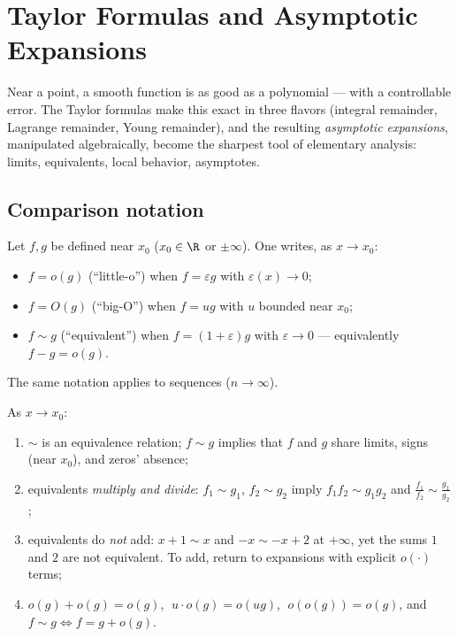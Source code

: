 \chapter{Taylor Formulas and Asymptotic Expansions}\label{ch:b1:taylor}

Near a point, a smooth function is as good as a polynomial --- with a
controllable error. The Taylor formulas make this exact in three
flavors (integral remainder, Lagrange remainder, Young remainder),
and the resulting \emph{asymptotic expansions}, manipulated
algebraically, become the sharpest tool of elementary analysis:
limits, equivalents, local behavior, asymptotes.

\section{Comparison notation}

\begin{definition}\label{def:b1:taylor:landau}
Let $f, g$ be defined near $x_0$ ($x_0 \in \R$ or $\pm\infty$). One
writes, as $x \to x_0$:
\begin{itemize}
  \item $f = o(g)$ (``little-o'') when $f = \varepsilon g$ with
        $\varepsilon(x) \to 0$;
  \item $f = O(g)$ (``big-O'') when $f = u g$ with $u$ bounded near
        $x_0$;
  \item $f \sim g$ (``equivalent'') when
        $f = (1 + \varepsilon) g$ with $\varepsilon \to 0$ ---
        equivalently $f - g = o(g)$.
\end{itemize}
The same notation applies to sequences ($n \to \infty$).
\end{definition}

\begin{proposition}[Rules]\label{prop:b1:taylor:landaurules}
As $x \to x_0$:
\begin{enumerate}
  \item $\sim$ is an equivalence relation; $f \sim g$ implies that
        $f$ and $g$ share limits, signs (near $x_0$), and zeros'
        absence;
  \item equivalents \emph{multiply and divide}: $f_1 \sim g_1$, $f_2
        \sim g_2$ imply $f_1 f_2 \sim g_1 g_2$ and $\frac{f_1}{f_2}
        \sim \frac{g_1}{g_2}$;
  \item equivalents do \emph{not} add: $x + 1 \sim x$ and $-x \sim
        -x + 2$ at $+\infty$, yet the sums $1$ and $2$ are not
        equivalent. To add, return to expansions with explicit
        $o(\cdot)$ terms;
  \item $o(g) + o(g) = o(g)$, $\;u \cdot o(g) = o(ug)$, $\;o(o(g)) =
        o(g)$, and $f \sim g \iff f = g + o(g)$.
\end{enumerate}
\end{proposition}

